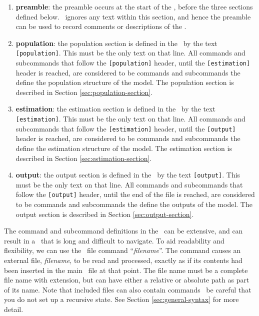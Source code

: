 \begin{enumerate}
\item \textbf{preamble}: 
the preamble occurs at the start of the \config, before the three sections defined below. \SPM\ ignores any text within this section, and hence the preamble can be used to record comments or descriptions of the \config. 

\item \textbf{population}: 
the population section is defined in the \config\ by the text \texttt{[population]}. This must be the only text on that line. All commands and subcommands that follow the \texttt{[population]} header, until the \texttt{[estimation]} header is reached, are considered to be commands and subcommands the define the population structure of the model. The population section is described in Section \ref{sec:population-section}.

\item \textbf{estimation}:
the estimation section is defined in the \config\ by the text \texttt{[estimation]}. This must be the only text on that line. All commands and subcommands that follow the \texttt{[estimation]} header, until the \texttt{[output]} header is reached, are considered to be commands and subcommands the define the estimation structure of the model.  The estimation section is described in Section \ref{sec:estimation-section}.

\item \textbf{output}:
the output section is defined in the \config\ by the text \texttt{[output]}. This must be the only text on that line. All commands and subcommands that follow the \texttt{[output]} header, until the end of the file is reached, are considered to be commands and subcommands the define the outputs of the model.  The output section is described in Section \ref{sec:output-section}.

\end{enumerate}

The command and subcommand definitions in the \config\ can be extensive, and can result in a \config\ that is long and difficult to navigate. To aid readability and flexibility, we can use the \config\ file command  ``\emph{filename}''. The command causes an external file, \emph{filename}, to be read and processed, exactly as if its contents had been inserted in the main \config\ file at that point. The file name must be a complete file name with extension, but can have either a relative or absolute path as part of its name. Note that included files can also contain  commands \textemdash\ be careful that you do not set up a recursive state. See Section \ref{sec:general-syntax} for more detail.

